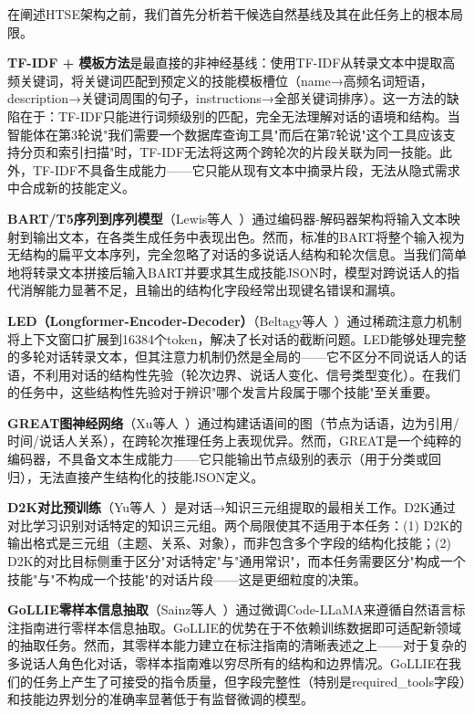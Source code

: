 \documentclass[conference]{IEEEtran}
\begin{document}
在阐述HTSE架构之前，我们首先分析若干候选自然基线及其在此任务上的根本局限。

\textbf{TF-IDF + 模板方法}是最直接的非神经基线：使用TF-IDF从转录文本中提取高频关键词，将关键词匹配到预定义的技能模板槽位（name→高频名词短语，description→关键词周围的句子，instructions→全部关键词排序）。这一方法的缺陷在于：TF-IDF只能进行词频级别的匹配，完全无法理解对话的语境和结构。当智能体在第3轮说"我们需要一个数据库查询工具"而后在第7轮说"这个工具应该支持分页和索引扫描"时，TF-IDF无法将这两个跨轮次的片段关联为同一技能。此外，TF-IDF不具备生成能力——它只能从现有文本中摘录片段，无法从隐式需求中合成新的技能定义。

\textbf{BART/T5序列到序列模型}（Lewis等人~\cite{lewis2019bart}）通过编码器-解码器架构将输入文本映射到输出文本，在各类生成任务中表现出色。然而，标准的BART将整个输入视为无结构的扁平文本序列，完全忽略了对话的多说话人结构和轮次信息。当我们简单地将转录文本拼接后输入BART并要求其生成技能JSON时，模型对跨说话人的指代消解能力显著不足，且输出的结构化字段经常出现键名错误和漏填。

\textbf{LED（Longformer-Encoder-Decoder）}（Beltagy等人~\cite{beltagy2020longformer}）通过稀疏注意力机制将上下文窗口扩展到16384个token，解决了长对话的截断问题。LED能够处理完整的多轮对话转录文本，但其注意力机制仍然是全局的——它不区分不同说话人的话语，不利用对话的结构性先验（轮次边界、说话人变化、信号类型变化）。在我们的任务中，这些结构性先验对于辨识"哪个发言片段属于哪个技能"至关重要。

\textbf{GREAT图神经网络}（Xu等人~\cite{xu2022great}）通过构建话语间的图（节点为话语，边为引用/时间/说话人关系），在跨轮次推理任务上表现优异。然而，GREAT是一个纯粹的编码器，不具备文本生成能力——它只能输出节点级别的表示（用于分类或回归），无法直接产生结构化的技能JSON定义。

\textbf{D2K对比预训练}（Yu等人~\cite{yu2022d2k}）是对话→知识三元组提取的最相关工作。D2K通过对比学习识别对话特定的知识三元组。两个局限使其不适用于本任务：(1) D2K的输出格式是三元组（主题、关系、对象），而非包含多个字段的结构化技能；(2) D2K的对比目标侧重于区分"对话特定"与"通用常识"，而本任务需要区分"构成一个技能"与"不构成一个技能"的对话片段——这是更细粒度的决策。

\textbf{GoLLIE零样本信息抽取}（Sainz等人~\cite{sainz2023gollie}）通过微调Code-LLaMA来遵循自然语言标注指南进行零样本信息抽取。GoLLIE的优势在于不依赖训练数据即可适配新领域的抽取任务。然而，其零样本能力建立在标注指南的清晰表述之上——对于复杂的多说话人角色化对话，零样本指南难以穷尽所有的结构和边界情况。GoLLIE在我们的任务上产生了可接受的指令质量，但字段完整性（特别是required\_tools字段）和技能边界划分的准确率显著低于有监督微调的模型。
\end{document}

